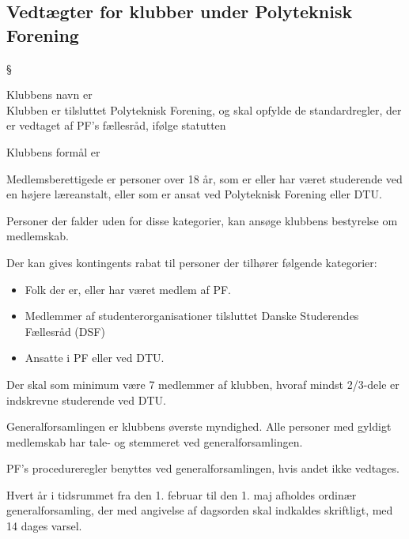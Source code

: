 \subsection{Vedtægter for klubber under Polyteknisk Forening}
\begin{list}
{\S {}}{}
\item Klubbens navn er \makebox[2in]{\hrulefill}\\

 Klubben er tilsluttet Polyteknisk Forening, og skal opfylde de standardregler, der er vedtaget af PF's fællesråd, ifølge statutten 

\item Klubbens formål er \makebox[2in]{\hrulefill}

\item Medlemsberettigede er personer over 18 år, som er eller har været studerende ved en højere læreanstalt, eller som er ansat ved Polyteknisk Forening eller DTU.

Personer der falder uden for disse kategorier, kan ansøge klubbens bestyrelse om medlemskab.

 Der kan gives kontingents rabat til personer der tilhører følgende kategorier:
\begin{itemize}
\item Folk der er, eller har været medlem af PF.
\item Medlemmer af studenterorganisationer tilsluttet Danske Studerendes Fællesråd (DSF)
\item Ansatte i PF eller ved DTU.
\end{itemize}

\item Der skal som minimum være 7 medlemmer af klubben, hvoraf mindst 2/3-dele er indskrevne studerende ved DTU.

\item Generalforsamlingen er klubbens øverste myndighed. Alle personer med gyldigt medlemskab har tale- og stemmeret ved generalforsamlingen.

PF's procedureregler benyttes ved generalforsamlingen, hvis andet ikke vedtages.
\item Hvert år i tidsrummet fra den 1. februar til den 1. maj afholdes ordinær generalforsamling, der med angivelse af dagsorden skal indkaldes skriftligt, med 14 dages varsel.


\end{list}
